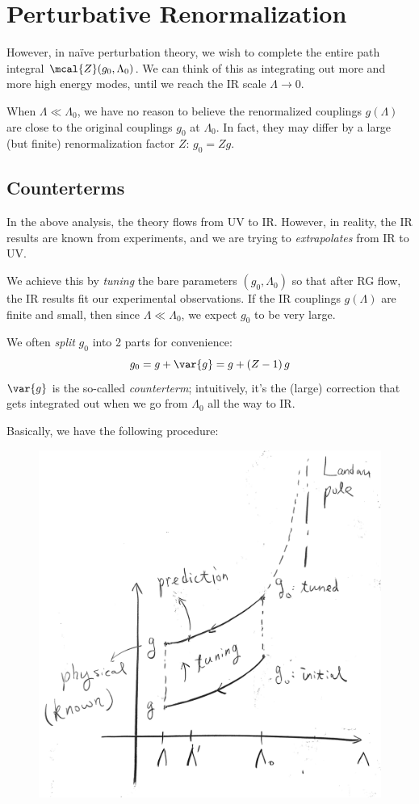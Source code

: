 \documentclass[a4paper
	,10pt
]{article}
\begin{document}
\section{Perturbative Renormalization}
	However, in naïve perturbation theory, we wish to complete the entire
	path integral $\mcal{Z} (g_0,\Lambda_0)$. We can think of this as
	integrating out more and more high energy modes, until we reach the IR
	scale $\Lambda \to 0$.
	
	When $\Lambda \ll \Lambda_0$, we have no reason to believe the
	renormalized couplings $g(\Lambda)$ are close to the original
	couplings $g_0$ at $\Lambda_0$. In fact, they may differ by a large
	(but finite) renormalization factor $Z$: $g_0 = Zg$.
	
\subsection{Counterterms}
	In the above analysis, the theory flows from UV to IR. However, in
	reality, the IR results are known from experiments, and we are trying to
	\emph{extrapolates} from IR to UV.
	
	We achieve this by \emph{tuning} the bare parameters $(g_0,\Lambda_0)$
	so that after RG flow, the IR results fit our experimental observations.
	If the IR couplings $g(\Lambda)$ are finite and small, then since
	$\Lambda \ll \Lambda_0$, we expect $g_0$ to be very large.
	
	We often \emph{split} $g_0$ into 2 parts for convenience:
	\begin{equation}
	  g_0 = g + \var{g}
	  = g + (Z - 1)\,g
	\end{equation}
	$\var{g}$ is the so-called \emph{counterterm}; intuitively, it's the
	(large) correction that gets integrated out when we go from
	$\Lambda_0$ all the way to IR.
	
	Basically, we have the following procedure:
	
	\begin{figure}[!h]
	\centering
	\includegraphics[width=.5\linewidth]{img/RG-process.png}
	\end{figure}
	
\end{document}
